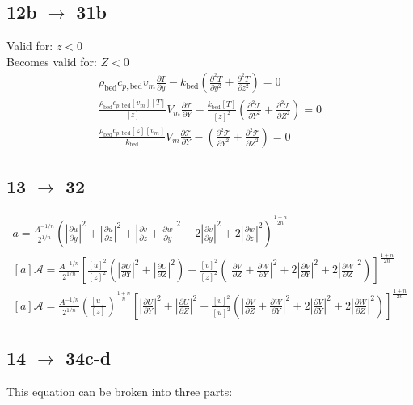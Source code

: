 \documentclass[10pt, letterpaper, twoside]{article}
\newcommand{\pd}[2]{\frac{\partial#1}{\partial#2}}
\begin{document}
	\subsection{12b $ \rightarrow $ 31b}
	Valid for: $ z<0 $\\
	Becomes valid for: $ Z<0 $
	\begin{gather*}
		\rho_{\text{bed}}c_{p,\text{bed}}v_m\pd{T}{y} - k_{\text{bed}}\left(\pd{^2T}{y^2}+\pd{^2T}{z^2}\right) = 0 \tag{12b} \\
		\frac{\rho_{\text{bed}}c_{p,\text{bed}}\left[v_m\right]\left[T\right]}{\left[z\right]}V_m\pd{\mathcal{T}}{Y} - \frac{k_{\text{bed}}\left[T\right]}{\left[z\right]^2}\left(\pd{^2\mathcal{T}}{Y^2}+\pd{^2\mathcal{T}}{Z^2}\right) = 0\\
		\frac{\rho_{\text{bed}}c_{p,\text{bed}}\left[z\right]\left[v_m\right]}{k_{\text{bed}}}V_m\pd{\mathcal{T}}{Y} - \left(\pd{^2\mathcal{T}}{Y^2}+\pd{^2\mathcal{T}}{Z^2}\right) = 0 \tag{12b'}
	\end{gather*}
	\subsection{13 $ \rightarrow $ 32}
	\begin{gather*}
		a = \frac{A^{-1/n}}{2^{1/n}}\left(\left|\pd{u}{y}\right|^2 + \left|\pd{u}{z}\right|^2 + \left|\pd{v}{z} + \pd{w}{y}\right|^2 + 2\left|\pd{v}{y}\right|^2 + 2\left|\pd{w}{z}\right|^2\right)^{\frac{1+n}{2n}} \tag{13} \\
		\left[a\right]\mathcal{A} = \frac{A^{-1/n}}{2^{1/n}}\left[\frac{\left[u\right]^2}{\left[z\right]^2}\left(\left|\pd{U}{Y}\right|^2 + \left|\pd{U}{Z}\right|^2\right) + \frac{\left[v\right]^2}{\left[z\right]^2}\left(\left|\pd{V}{Z} + \pd{W}{Y}\right|^2 + 2\left|\pd{V}{Y}\right|^2 + 2\left|\pd{W}{Z}\right|^2\right)\right]^{\frac{1+n}{2n}}\\
		\left[a\right]\mathcal{A} = \frac{A^{-1/n}}{2^{1/n}}\left(\frac{\left[u\right]}{\left[z\right]}\right)^{\frac{1+n}{n}}\left[\left|\pd{U}{Y}\right|^2 + \left|\pd{U}{Z}\right|^2 + \frac{\left[v\right]^2}{\left[u\right]^2}\left(\left|\pd{V}{Z} + \pd{W}{Y}\right|^2 + 2\left|\pd{V}{Y}\right|^2 + 2\left|\pd{W}{Z}\right|^2\right)\right]^{\frac{1+n}{2n}} \tag{13'}
	\end{gather*}
	
	\newpage
	
	\subsection{14 $ \rightarrow $ 34c-d}
	This equation can be broken into three parts:
\end{document}

